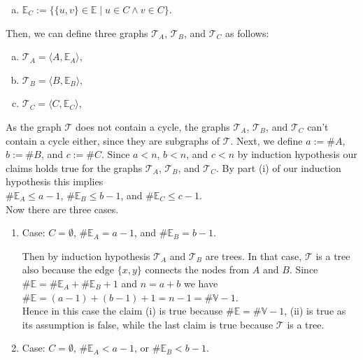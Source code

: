 \begin{enumerate}
\begin{enumerate}[(a)]
  \item $\mathbb{E}_C := \bigl\{ \{u,v\}\in\mathbb{E} \mid u\in C \wedge v\in C \bigr\}$.
  \end{enumerate}
  Then, we can define three graphs $\mathcal{T}_A$, $\mathcal{T}_B$, and $\mathcal{T}_C$ as follows:
  \begin{enumerate}[(a)]
  \item $\mathcal{T}_A = \langle A, \mathbb{E}_A \rangle$,
  \item $\mathcal{T}_B = \langle B, \mathbb{E}_B \rangle$,
  \item $\mathcal{T}_C = \langle C, \mathbb{E}_C \rangle$,
  \end{enumerate}
  As the graph $\mathcal{T}$ does not contain a cycle, the graphs $\mathcal{T}_A$, $\mathcal{T}_B$, and $\mathcal{T}_C$ can't contain a cycle either,
  since they are subgraphs of $\mathcal{T}$.  Next, we define $a := \# A$, $b := \# B$, and $c := \# C$.
  Since $a < n$, $b < n$, and $c < n$ by induction hypothesis our claims holds true for the graphs  $\mathcal{T}_A$, $\mathcal{T}_B$, and
  $\mathcal{T}_C$.  By part (i) of our induction hypothesis this implies
    \\[0.2cm]
  \hspace*{1.3cm}
  $\# \mathbb{E}_A \leq a - 1$, \quad
  $\# \mathbb{E}_B \leq b - 1$, \quad and \quad $\# \mathbb{E}_C \leq c - 1$.
  \\[0.2cm]
  Now there are three cases.
  \begin{enumerate}
  \item Case: $C = \emptyset$, $\#\mathbb{E}_A = a - 1$, and $\#\mathbb{E}_B = b - 1$.
    
    Then by induction hypothesis $\mathcal{T}_A$ and $\mathcal{T}_B$ are trees.  In that case, $\mathcal{T}$ is
    a tree also because the edge $\{x,y\}$ connects the nodes from $A$ and $B$.
    Since $\#\mathbb{E} = \#\mathbb{E}_A + \#\mathbb{E}_B + 1$ and $n = a + b$ we have
    \\[0.2cm]
    \hspace*{1.3cm}
    $\#\mathbb{E} = (a - 1) + (b - 1) + 1 = n - 1 = \#\mathbb{V} - 1$.
    \\[0.2cm]
    Hence in this case the claim (i) is true because $\# \mathbb{E} = \# \mathbb{V} - 1$, (ii)  is true as
    its assumption is false,  while the last claim is true because $\mathcal{T}$ is a tree.
    \green{$\surd$}
  \item Case: $C = \emptyset$, $\#\mathbb{E}_A < a - 1$, or $\#\mathbb{E}_B < b - 1$.
    

\end{enumerate}
\end{enumerate}

